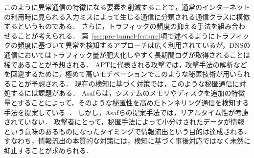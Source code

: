 このように異常通信の特徴になる要素を削減することで，通常のインターネットの利用時に見られる入力ミスによって生じる通信に分類される通信クラスに模倣するというものである．
さらに，トラフィックの頻度の抑える手法を組み合わせることが考えられる．
第~\ref{sec:pre-tunnel-feature}項で述べるようにトラフィックの頻度に基づいて異常を検知するアプローチは広く利用されているが，DNSの通信においてはトラフィック量が肥大化しやすく長期間ログが取得されることは稀であることが予想される．
APTに代表される攻撃では，攻撃手法の解析などを回避するために，極めて高いモチベーションでこのような秘匿技術が用いられることが予想される．
現在の検知に基づく対策では，このような秘匿通信に対処するには課題がある．
Asafらは，システムのメモリやディスクを追加の特徴量とすることによって，そのような秘匿性を高めたトンネリング通信を検知する手法を提案している~\cite{asaf}．
しかし，Asafらの提案手法では，リアルタイム性が考慮されていない．
攻撃者にとって，秘匿手法によって小分けされたデータが情報という意味のあるものになったタイミングで情報流出という目的は達成される．
すなわち，情報流出の本質的な対策には，検知に基づく事後対応ではなく未然に抑止することが求められる．
